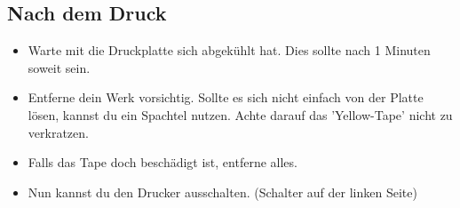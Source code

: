 \documentclass[a4paper]{article}
\begin{document}
\subsection{Nach dem Druck}
\begin{itemize}
	\item Warte mit die Druckplatte sich abgekühlt hat. Dies sollte nach 1 Minuten soweit sein.
	\item Entferne dein Werk vorsichtig. Sollte es sich nicht einfach von der Platte lösen, kannst du ein Spachtel nutzen. Achte darauf das 'Yellow-Tape' nicht zu verkratzen.
	\item Falls das Tape doch beschädigt ist, entferne alles.
	\item Nun kannst du den Drucker ausschalten. (Schalter auf der linken Seite)
\end{itemize}
\end{document}
